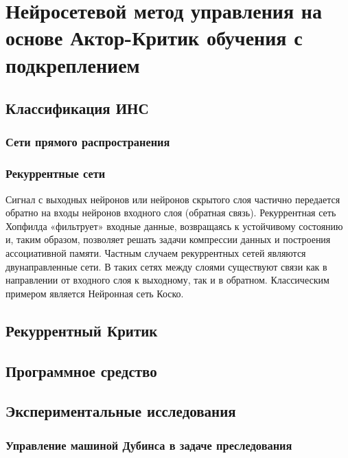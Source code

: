 \chapter{Нейросетевой метод управления на основе Актор-Критик обучения с подкреплением} \label{chapt3}

\section{Классификация ИНС} \label{sect3_1}

\subsection{Сети прямого распространения} \label{subsect3_1_1}

\subsection{Рекуррентные сети} \label{subsect3_1_2}
Сигнал с выходных нейронов или нейронов скрытого слоя частично передается обратно на входы нейронов входного слоя (обратная связь). Рекуррентная сеть Хопфилда «фильтрует» входные данные, возвращаясь к устойчивому состоянию и, таким образом, позволяет решать задачи компрессии данных и построения ассоциативной памяти. Частным случаем рекуррентных сетей являются двунаправленные сети. В таких сетях между слоями существуют связи как в направлении от входного слоя к выходному, так и в обратном. Классическим примером является Нейронная сеть Коско.

\section{Рекуррентный Критик} \label{sect3_2}

\section{Программное средство} \label{sect3_3}

\section{Экспериментальные исследования} \label{sect3_4}

\subsection{Управление машиной Дубинса в задаче преследования} \label{subsect3_3_1}

